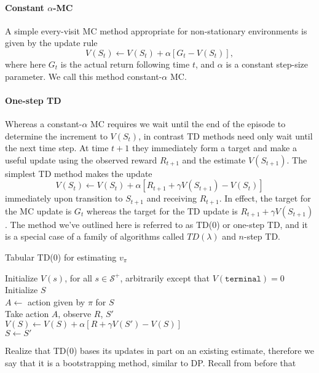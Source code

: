 \documentclass[12pt]{article}
\begin{document}
\paragraph{Constant $\alpha$-MC}
A simple every-visit MC method appropriate for non-stationary environments is given by the update rule
\[
  V(S_t) \gets V(S_t) + \alpha \left[ G_t - V(S_t)\right],
\]
where here $G_t$ is the actual return following time $t$, and $\alpha$ is a constant step-size parameter. We call this method constant-$\alpha$ MC.
\paragraph{One-step TD}
Whereas a constant-$\alpha$ MC requires we wait until the end of the episode to determine the increment to $V(S_t)$, in contrast TD methods need only wait until the next time step. At time $t+1$ they immediately form a target and make a useful update using the observed reward $R_{t+1}$ and the estimate $V(S_{t+1})$. The simplest TD method makes the update
\begin{equation}
  \label{eq: simplesttdupdate}
  V(S_t) \gets V(S_t) + \alpha \left[ R_{t+1} + \gamma V(S_{t+1}) - V(S_t)\right]
\end{equation}
immediately upon transition to $S_{t+1}$ and receiving $R_{t+1}$. In effect, the target for the MC update is $G_t$ whereas the target for the TD update is $R_{t+1} + \gamma V(S_{t+1})$. The method we've outlined here is referred to as TD(0) or one-step TD, and it is a special case of a family of algorithms called $TD(\lambda)$ and $n$-step TD.
\begin{algorithm}[h]
  \caption{Tabular TD(0) for estimating $v_\pi$}
  \KwInput{The policy $\pi$ to be evaluated; step size $\alpha \in (0, 1]$}
  Initialize $V(s)$, for all $s \in \mathcal S^+$, arbitrarily except that   $V(\texttt{terminal}) = 0$ \\
 {
  Initialize $S$ \\
   {
    $A \gets $ action given by $\pi$ for $S$ \\
    Take action $A$, observe $R$, $S'$ \\
    $V(S) \gets V(S) + \alpha \left[ R + \gamma V(S') - V(S) \right]$ \\
    $S \gets S'$
  }
}
\end{algorithm}
Realize that TD(0) bases its updates in part on an existing estimate, therefore we say that it is a bootstrapping method, similar to DP. Recall from before that
\end{document}
